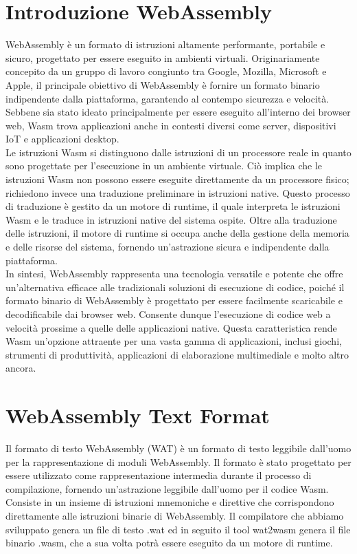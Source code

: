 \documentclass[../../main.tex]{subfiles}
\begin{document}
\section{Introduzione WebAssembly}
WebAssembly è un formato di istruzioni altamente performante, portabile e sicuro, progettato per essere eseguito in ambienti virtuali. Originariamente concepito da un gruppo di lavoro congiunto tra Google, Mozilla, Microsoft e Apple, il principale obiettivo di WebAssembly è fornire un formato binario indipendente dalla piattaforma, garantendo al contempo sicurezza e velocità. Sebbene sia stato ideato principalmente per essere eseguito all'interno dei browser web, Wasm trova applicazioni anche in contesti diversi come server, dispositivi IoT e applicazioni desktop.\\
Le istruzioni Wasm si distinguono dalle istruzioni di un processore reale in quanto sono progettate per l'esecuzione in un ambiente virtuale. Ciò implica che le istruzioni Wasm non possono essere eseguite direttamente da un processore fisico; richiedono invece una traduzione preliminare in istruzioni native. Questo processo di traduzione è gestito da un motore di runtime, il quale interpreta le istruzioni Wasm e le traduce in istruzioni native del sistema ospite. Oltre alla traduzione delle istruzioni, il motore di runtime si occupa anche della gestione della memoria e delle risorse del sistema, fornendo un'astrazione sicura e indipendente dalla piattaforma.\\
In sintesi, WebAssembly rappresenta una tecnologia versatile e potente che offre un'alternativa efficace alle tradizionali soluzioni di esecuzione di codice, poiché il formato binario di WebAssembly è progettato per essere facilmente scaricabile e decodificabile dai browser web. Consente dunque l'esecuzione di codice web a velocità prossime a quelle delle applicazioni native. Questa caratteristica rende Wasm un'opzione attraente per una vasta gamma di applicazioni, inclusi giochi, strumenti di produttività, applicazioni di elaborazione multimediale e molto altro ancora.\autocite{WebAssemblyDoc}

\section{WebAssembly Text Format}
\label{wat}
Il formato di testo WebAssembly (WAT) \autocite{WebAssemblyTextFormat} è un formato di testo leggibile dall'uomo per la rappresentazione di moduli WebAssembly. Il formato è stato progettato per essere utilizzato come rappresentazione intermedia durante il processo di compilazione, fornendo un'astrazione leggibile dall'uomo per il codice Wasm.
Consiste in un insieme di istruzioni mnemoniche e direttive che corrispondono direttamente alle istruzioni binarie di WebAssembly.
Il compilatore che abbiamo sviluppato genera un file di testo .wat ed in seguito il tool wat2wasm \autocite{jain2022webassembly} genera il file binario .wasm, che a sua volta potrà essere eseguito da un motore di runtime.
\end{document}
